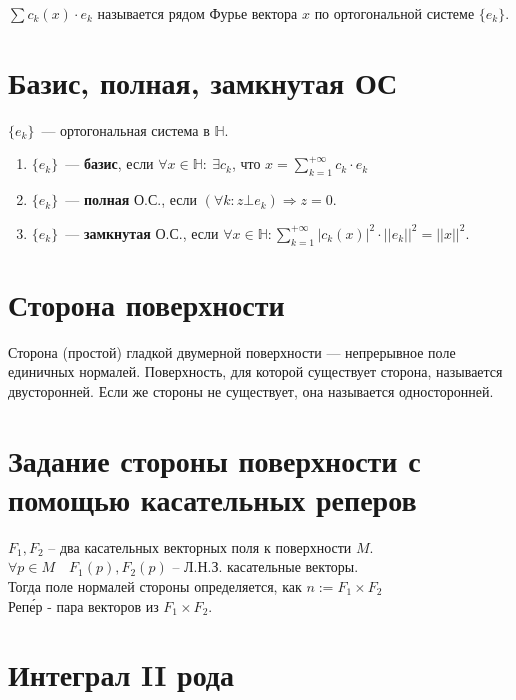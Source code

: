 \documentclass[paper=a4, fontsize=17pt]{article}
\begin{document}
	$\sum c_k(x) \cdot e_k$ называется рядом Фурье вектора $x$ по ортогональной системе $\{e_k\}$.

	\section{Базис, полная, замкнутая ОС}

	$\{e_k\}$~--- ортогональная система в $\mathds{H}$.

	\begin{enumerate}

		\item $\{e_k\}$~--- \textbf{базис}, если $\forall x \in \mathds{H}:\ \exists c_k$, что $x = \sum\limits_{k=1}^{+\infty} c_k \cdot e_k$

		\item $\{e_k\}$~--- \textbf{полная} О.С., если $(\forall k: z \bot e_k) \Rightarrow z = 0$.

		\item $\{e_k\}$~--- \textbf{замкнутая} О.С., если $\forall x \in \mathds{H}: \sum\limits_{k=1}^{+\infty} |c_k(x)|^2 \cdot ||e_k||^2 = ||x||^2$.

	\end{enumerate}

	\section{Сторона поверхности}

	Сторона (простой) гладкой двумерной поверхности {{---}} непрерывное поле единичных нормалей. Поверхность, для которой существует сторона, называется двусторонней. Если же стороны не существует, она называется односторонней.


	\section{Задание стороны поверхности с помощью касательных реперов}

	$F_1, F_2$ -- два касательных векторных поля к поверхности $M$.\\
	$\forall p \in M \quad F_1(p), F_2(p)$ -- Л.Н.З. касательные векторы.\\
	Тогда поле нормалей стороны определяется, как $n := F_1 \times F_2$\\

	Реп\'{е}р - пара векторов из $F_1 \times F_2$.

	\section{Интеграл II рода}
\end{document}
